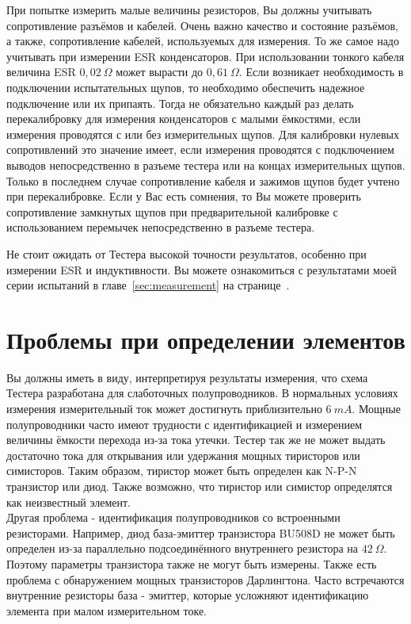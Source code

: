 При попытке измерить малые величины резисторов, Вы должны учитывать сопротивление разъёмов и кабелей. Очень важно 
качество и состояние разъёмов, а также, сопротивление кабелей, используемых для измерения. То же самое надо учитывать 
при измерении ESR конденсаторов. При использовании тонкого кабеля величина ESR \(0,02~\Omega\) может вырасти 
до \(0,61~\Omega\).
Если возникает необходимость в подключении испытательных щупов, то необходимо обеспечить надежное подключение
или их припаять. 
Тогда не обязательно каждый раз делать перекалибровку для измерения конденсаторов с малыми ёмкостями,
если измерения проводятся с или без измерительных щупов.
Для калибровки нулевых сопротивлений это значение имеет, если измерения проводятся с подключением выводов
непосредственно в разъеме тестера или на концах измерительных щупов.  
Только в последнем случае сопротивление кабеля и зажимов щупов будет учтено при перекалибровке.
Если у Вас есть сомнения, то Вы можете проверить сопротивление замкнутых щупов при предварительной
калибровке с использованием перемычек непосредственно в разъеме тестера.

Не стоит ожидать от Тестера высокой точности результатов, особенно при измерении ESR и индуктивности. Вы можете 
ознакомиться с результатами моей серии испытаний в главе~\ref{sec:measurement} на странице~\pageref{sec:measurement}.

\section{Проблемы при определении элементов}
Вы должны иметь в виду, интерпретируя результаты измерения, что схема Тестера разработана для слаботочных 
полупроводников. В нормальных условиях измерения измерительный ток может достигнуть приблизительно \(6~mA\). 
Мощные полупроводники часто имеют трудности с идентификацией и измерением величины ёмкости перехода из-за тока 
утечки. Тестер так же не может выдать достаточно тока для открывания или удержания  мощных тиристоров или симисторов. 
Таким образом, тиристор может быть определен как N-P-N транзистор или диод. Также возможно, что тиристор или симистор 
определятся как неизвестный элемент.\\

Другая проблема - идентификация полупроводников со встроенными резисторами. Например, диод база-эмиттер транзистора 
BU508D не может быть определен из-за параллельно подсоединённого внутреннего  резистора на \(42~\Omega\).
Поэтому параметры транзистора также не могут быть измерены. Также есть проблема с обнаружением мощных транзисторов  
Дарлингтона. Часто встречаются внутренние резисторы база - эмиттер, которые усложняют идентификацию элемента при 
малом измерительном токе.

